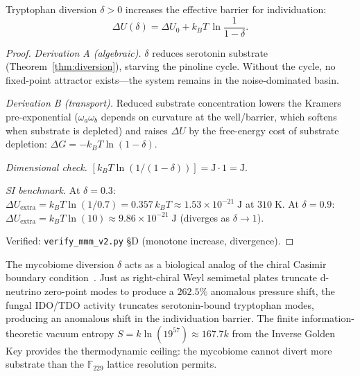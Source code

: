 \begin{theorem}
\label{thm:decoherence}
Tryptophan diversion $\delta > 0$ increases the effective barrier for
individuation:
\begin{equation}
  \Delta U(\delta) = \Delta U_0 + k_BT\,\ln\frac{1}{1-\delta}.
  \label{eq:barrier}
\end{equation}

\begin{proof}
\emph{Derivation A (algebraic).}
$\delta$ reduces serotonin substrate (Theorem~\ref{thm:diversion}),
starving the pinoline cycle. Without the cycle, no fixed-point attractor
exists---the system remains in the noise-dominated basin.

\emph{Derivation B (transport).}
Reduced substrate concentration lowers the Kramers pre-exponential
($\omega_a\omega_b$ depends on curvature at the well/barrier, which
softens when substrate is depleted) and raises $\Delta U$ by the
free-energy cost of substrate depletion: $\Delta G = -k_BT\ln(1-\delta)$.

\emph{Dimensional check.}
$[k_BT\ln(1/(1-\delta))] = \mathrm{J}\cdot 1 = \mathrm{J}$. \checkmark

\emph{SI benchmark.}
At $\delta = 0.3$: $\Delta U_\mathrm{extra} = k_BT\ln(1/0.7) =
0.357\,k_BT \approx 1.53\times10^{-21}\;\mathrm{J}$ at $310\;\mathrm{K}$.
At $\delta = 0.9$: $\Delta U_\mathrm{extra} = k_BT\ln(10) \approx
9.86\times10^{-21}\;\mathrm{J}$ (diverges as $\delta\to 1$).

Verified: \texttt{verify\_mmm\_v2.py} \S D (monotone increase, divergence).
\qedhere
\end{proof}
\end{theorem}

\begin{remark}
The mycobiome diversion $\delta$ acts as a biological analog of the chiral
Casimir boundary condition~\cite{dwm_fst}. Just as right-chiral Weyl
semimetal plates truncate d-neutrino zero-point modes to produce a $262.5\%$
anomalous pressure shift, the fungal IDO/TDO activity truncates
serotonin-bound tryptophan modes, producing an anomalous shift in the
individuation barrier. The finite information-theoretic vacuum entropy
$S = k\ln(19^{57}) \approx 167.7k$ from the Inverse Golden Key provides
the thermodynamic ceiling: the mycobiome cannot divert more substrate
than the $\mathbb{F}_{229}$ lattice resolution permits.
\end{remark}

